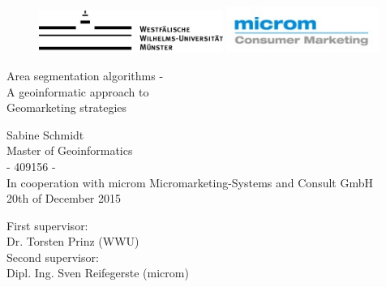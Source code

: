 
\thispagestyle{empty}

	
		\begin{center}
			
						\begin{figure}[htbp]
						\begin{minipage}[b][1cm]{0.6\textwidth}
						\includegraphics[width=6cm]{images/WWU_Logo1_1c}
						\end{minipage}
						\hfill
						\begin{minipage}[b][1cm]{0.3\textwidth}
						\includegraphics[width=5cm]{images/microm.jpg}
						\end{minipage}
						\end{figure}
			
				\par
				\vspace*{14ex}
		\Huge
					Area segmentation algorithms - \\
					A geoinformatic approach to \\
					Geomarketing strategies\\
				\par
		\normalsize
		\large
					 
			
				\vspace*{15ex}
					Sabine Schmidt\\
					Master of Geoinformatics\\
					- 409156 - \\
					\vspace*{2ex}
					In cooperation with microm Micromarketing-Systems and Consult GmbH\\
				\vspace*{1ex}	
					20th of December 2015
				\par
			\end{center}
			
			\vspace*{25ex}
			First supervisor:\\
			Dr. Torsten Prinz (WWU)\\
			Second supervisor:\\
			Dipl. Ing. Sven Reifegerste (microm)